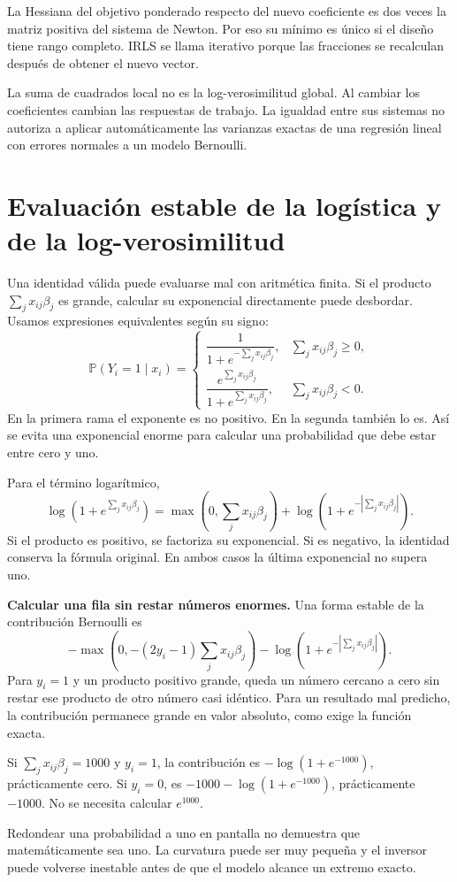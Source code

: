 \documentclass[11pt,a4paper]{article}
\newcommand{\Prob}{\mathbb P}
\begin{document}
La Hessiana del objetivo ponderado respecto del nuevo coeficiente
es dos veces la matriz positiva del sistema de Newton.
Por eso su mínimo es único si el diseño tiene rango completo.
IRLS se llama iterativo porque las fracciones se recalculan
después de obtener el nuevo vector.

La suma de cuadrados local no es la log-verosimilitud global.
Al cambiar los coeficientes cambian las respuestas de trabajo.
La igualdad entre sus sistemas no autoriza a aplicar
automáticamente las varianzas exactas de una regresión lineal
con errores normales a un modelo Bernoulli.

\clearpage
\section{Evaluación estable de la logística y de la log-verosimilitud}\label{logit49}
Una identidad válida puede evaluarse mal con aritmética finita.
Si el producto $\sum_jx_{ij}\beta_j$ es grande, calcular su exponencial
directamente puede desbordar.
Usamos expresiones equivalentes según su signo:
\[
\Prob(Y_i=1\mid x_i)=
\begin{cases}
\dfrac1{1+e^{-\sum_jx_{ij}\beta_j}},
&\sum_jx_{ij}\beta_j\ge0,\\[6pt]
\dfrac{e^{\sum_jx_{ij}\beta_j}}
{1+e^{\sum_jx_{ij}\beta_j}},
&\sum_jx_{ij}\beta_j<0.
\end{cases}
\]
En la primera rama el exponente es no positivo.
En la segunda también lo es.
Así se evita una exponencial enorme para calcular una
probabilidad que debe estar entre cero y uno.

Para el término logarítmico,
\[
\log(1+e^{\sum_jx_{ij}\beta_j})
=\max(0,\sum_jx_{ij}\beta_j)
+\log(1+e^{-|\sum_jx_{ij}\beta_j|}).
\]
Si el producto es positivo, se factoriza su exponencial.
Si es negativo, la identidad conserva la fórmula original.
En ambos casos la última exponencial no supera uno.

\textbf{Calcular una fila sin restar números enormes.}
Una forma estable de la contribución Bernoulli es
\[
-\max(0,-(2y_i-1)\sum_jx_{ij}\beta_j)
-\log\left(1+e^{-|\sum_jx_{ij}\beta_j|}\right).
\]
Para $y_i=1$ y un producto positivo grande,
queda un número cercano a cero sin restar ese producto
de otro número casi idéntico.
Para un resultado mal predicho, la contribución permanece
grande en valor absoluto, como exige la función exacta.

\begin{ejemplo}
Si $\sum_jx_{ij}\beta_j=1000$ y $y_i=1$,
la contribución es $-\log(1+e^{-1000})$, prácticamente cero.
Si $y_i=0$, es $-1000-\log(1+e^{-1000})$,
prácticamente $-1000$.
No se necesita calcular $e^{1000}$.
\end{ejemplo}
Redondear una probabilidad a uno en pantalla no demuestra
que matemáticamente sea uno.
La curvatura puede ser muy pequeña y el inversor puede volverse
inestable antes de que el modelo alcance un extremo exacto.
\end{document}
